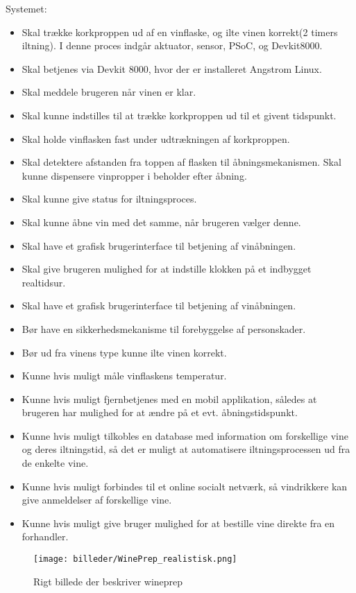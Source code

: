Systemet: \begin{itemize}
	\item Skal trække korkproppen ud af en vinflaske, og ilte vinen korrekt(2 timers iltning). I denne proces indgår aktuator, sensor, PSoC, og Devkit8000.
	\item Skal betjenes via Devkit 8000, hvor der er installeret Angstrom Linux.
	\item Skal meddele brugeren når vinen er klar.
	\item Skal kunne indstilles til at trække korkproppen ud til et givent tidspunkt.
	\item Skal holde vinflasken fast under udtrækningen af korkproppen.
	\item Skal detektere afstanden fra toppen af flasken til åbningsmekanismen.
	Skal kunne dispensere vinpropper i beholder efter åbning.
	\item Skal kunne give status for iltningsproces.
	\item Skal kunne åbne vin med det samme, når brugeren vælger denne.
	\item Skal have et grafisk brugerinterface til betjening af vinåbningen.
	\item Skal give brugeren mulighed for at indstille klokken på et indbygget realtidsur.
	\item Skal have et grafisk brugerinterface til betjening af vinåbningen.
	\item Bør have en sikkerhedsmekanisme til forebyggelse af personskader.
	\item Bør ud fra vinens type kunne ilte vinen korrekt.
	\item Kunne hvis muligt måle vinflaskens temperatur.
	\item Kunne hvis muligt fjernbetjenes med en mobil applikation, således at brugeren har mulighed for at ændre på et evt. åbningstidspunkt.
	\item Kunne hvis muligt tilkobles en database med information om forskellige vine og deres iltningstid, så det er muligt at automatisere iltningsprocessen ud fra de enkelte vine.
	\item Kunne hvis muligt forbindes til et online socialt netværk, så vindrikkere kan give anmeldelser af forskellige vine.
	\item Kunne hvis muligt give bruger mulighed for at bestille vine direkte fra en forhandler.
\end{itemize}

\begin{figure}[H]
	\caption{Rigt billede der beskriver wineprep}
	\label{RIGTBILLEDE}
	\texttt{[image: billeder/WinePrep\_realistisk.png]}
\end{figure}
